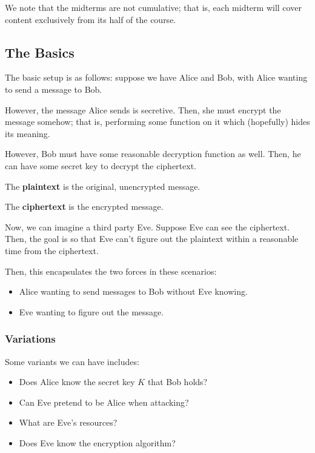\documentclass[openany]{book}
\begin{document}
We note that the midterms are not cumulative; that is, each midterm will cover content exclusively from its half of the course.

\subsection{The Basics}
The basic setup is as follows: suppose we have Alice and Bob, with Alice wanting to send a message to Bob.

However, the message Alice sends is secretive. Then, she must encrypt the message somehow; that is, performing some function on it which (hopefully) hides its meaning.


However, Bob must have some reasonable decryption function as well. Then, he can have some secret key to decrypt the ciphertext.

\begin{defn}
	The \textbf{plaintext} is the original, unencrypted message.
	
	The \textbf{ciphertext} is the encrypted message.
\end{defn}

Now, we can imagine a third party Eve. Suppose Eve can see the ciphertext. Then, the goal is so that Eve can't figure out the plaintext within a reasonable time from the ciphertext.

Then, this encapsulates the two forces in these scenarios:
\begin{itemize}
	\item Alice wanting to send messages to Bob without Eve knowing.
	\item Eve wanting to figure out the message.
\end{itemize}

\subsubsection{Variations}
Some variants we can have includes:
\begin{itemize}
	\item Does Alice know the secret key $K$ that Bob holds?
	\item Can Eve pretend to be Alice when attacking?
	\item What are Eve's resources?
	\item Does Eve know the encryption algorithm?
\end{itemize}
\end{document}
